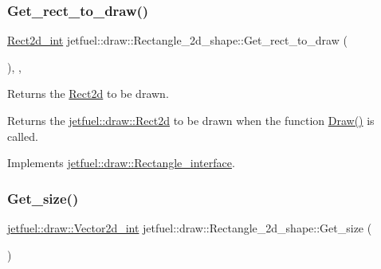 \mbox{\label{classjetfuel_1_1draw_1_1Rectangle__2d__shape_a1ed2975565e629d2b8d3fffa0a4756b2}} 
\subsubsection{\texorpdfstring{Get\+\_\+rect\+\_\+to\+\_\+draw()}{Get\_rect\_to\_draw()}}
{\footnotesize\ttfamily \hyperlink{classjetfuel_1_1draw_1_1Rect2d}{Rect2d\+\_\+int} jetfuel\+::draw\+::\+Rectangle\+\_\+2d\+\_\+shape\+::\+Get\+\_\+rect\+\_\+to\+\_\+draw (\begin{DoxyParamCaption}{ }\end{DoxyParamCaption})\hspace{0.3cm}{\ttfamily [inline]}, {\ttfamily [override]}, {\ttfamily [virtual]}}



Returns the \hyperlink{classjetfuel_1_1draw_1_1Rect2d}{Rect2d} to be drawn. 

Returns the \hyperlink{classjetfuel_1_1draw_1_1Rect2d}{jetfuel\+::draw\+::\+Rect2d} to be drawn when the function \hyperlink{classjetfuel_1_1draw_1_1Rectangle__2d__shape_aba19e63d55c824de135932483fe40fcb}{Draw()} is called. 

Implements \hyperlink{classjetfuel_1_1draw_1_1Rectangle__interface_a03fd3b6842ab7b3065379caec407296f}{jetfuel\+::draw\+::\+Rectangle\+\_\+interface}.

\mbox{\label{classjetfuel_1_1draw_1_1Rectangle__2d__shape_ace7c296b14b0ad8f15e6ed1115000b1e}} 
\subsubsection{\texorpdfstring{Get\+\_\+size()}{Get\_size()}}
{\footnotesize\ttfamily \hyperlink{classjetfuel_1_1draw_1_1Vector2d}{jetfuel\+::draw\+::\+Vector2d\+\_\+int} jetfuel\+::draw\+::\+Rectangle\+\_\+2d\+\_\+shape\+::\+Get\+\_\+size (\begin{DoxyParamCaption}{ }\end{DoxyParamCaption})\hspace{0.3cm}{\ttfamily [inline]}}



